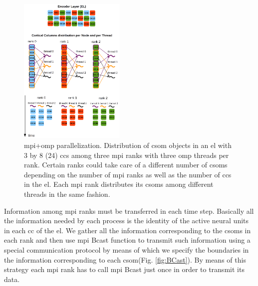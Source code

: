 \documentclass[10pt,journal,compsoc]{IEEEtran}
\begin{document}

\begin{figure}[h!]
    \centering
    \includegraphics[width=0.45\textwidth]{Encoder_Parallelization.png}
    \caption{ \gls{mpi}+\gls{omp} parallelization. Distribution of \gls{csom} objects in an \gls{el} with 3 by 8 (24) \glspl{cc} among three \gls{mpi} ranks with three \gls{omp} threads per rank. Certain ranks could take care of a different number of \glspl{csom} depending on the number of \gls{mpi} ranks as well as the number of \glspl{cc} in the \gls{el}. Each \gls{mpi} rank distributes its \glspl{csom} among different threads in the same fashion.}
    \label{fig:Encoder_Parallelization}
\end{figure}

Information among \gls{mpi} ranks must be transferred in each time step. Basically all the information needed by each process is the identity of the active neural units in each \gls{cc} of the \gls{el}. We gather all the information corresponding to the \glspl{csom} in each rank and then use \gls{mpi} Bcast function to transmit such information using a special communication protocol by means of which we specify the boundaries in the information corresponding to each \gls{csom}(Fig. \ref{fig:BCast}). By means of this strategy each \gls{mpi} rank has to call \gls{mpi} Bcast just once in order to transmit its data.
\end{document}
